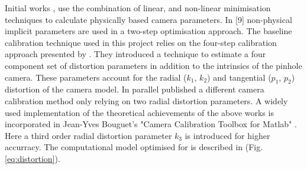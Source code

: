 \documentclass{ucl_thesis}
\newcommand{\figref}[1]{(Fig. \ref{#1})}
\begin{document}
Initial works \citep{Melen:1994}, \citep{Weng:1992} use the combination of linear, and non-linear minimisation techniques to calculate physically based camera parameters. In [9] non-physical implicit parameters are used in a two-step optimisation approach. The baseline calibration technique used in this project relies on the four-step calibration approach presented by \citep{Heikkila:1997}. They introduced a technique to estimate a four component set of distortion parameters in addition to the intrinsics of the pinhole camera. These parameters account for the radial ($k_1$, $k_2$) and tangential ($p_1$, $p_2$) distortion of the camera model. In parallel \citep{Zhang00} published a different camera calibration method only relying on two radial distortion parameters. A widely used implementation of the theoretical achievements of the above works is incorporated in Jean-Yves Bouguet's "Camera Calibration Toolbox for Matlab" \citep{calibration_bouguet}. Here a third order radial distortion parameter $k_3$ is introduced for higher accurracy. The computational model optimised for is described in \figref{eq:distortion}.
\end{document}
